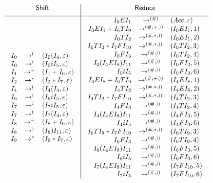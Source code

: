 \documentclass{jarticle}
\begin{document}
 \[
 \begin{array}{c|c}
  \mbox{\sf Shift} & \mbox{\sf Reduce}\\[5pt]\hline
 \begin{array}{rcl}
  I_0 & \rightarrow^{(} & (I_0(I_4,\varepsilon)\\
  I_0 & \rightarrow^{i} & (I_0iI_5,\varepsilon)\\
  I_1 & \rightarrow^{+} & (I_1+I_6,\varepsilon)\\
  I_2 & \rightarrow^{\ast} & (I_2\ast I_7,\varepsilon)\\
  I_4 & \rightarrow^{(} & (I_4(I_4,\varepsilon)\\
  I_6 & \rightarrow^{i} & (I_6iI_5,\varepsilon)\\
  I_7 & \rightarrow^{i} & (I_7iI_5,\varepsilon)\\
  I_7 & \rightarrow^{(} & (I_7(I_4,\varepsilon)\\
  I_8 & \rightarrow^{+} & (I_8+I_6,\varepsilon)\\
  I_8 & \rightarrow^{)} & (I_8)I_{11},\varepsilon)\\
  I_9 & \rightarrow^{\ast} & (I_9\ast I_7,\varepsilon)
 \end{array} &
 \begin{array}{rcl}
  I_0EI_1 & \rightarrow^{(\#)} & (Acc,\varepsilon)\\
  I_0EI_1+I_6TI_9 & \rightarrow^{(\#,+,))}&(I_0EI_1,1)\\
  I_0TI_2 & \rightarrow^{(\#,\ast,))} & (I_0EI_1,2)\\
  I_0TI_2\ast I_7FI_{10} & \rightarrow^{(\#,\ast,))}&(I_0TI_2,3)\\
  I_0FI_3 & \rightarrow^{(\#,))} & (I_0TI_2,4)\\
  I_0(I_4EI_8)I_{11} & \rightarrow^{(\#,))} & (I_0FI_3,5)\\
  I_0iI_5 & \rightarrow^{(\#,))} & (I_0FI_3,6)\\
  I_4EI_8+I_6TI_9 & \rightarrow^{(\#,+,))} & (I_4EI_8,1)\\
  I_4TI_2 & \rightarrow^{(\#,\ast,))} & (I_4EI_8,2)\\
  I_4TI_2\ast I_7FI_{10} & \rightarrow^{(\#,\ast,))}&(I_4TI_2,3)\\
  I_4FI_3 & \rightarrow^{(\#,))} & (I_4TI_2,4)\\
  I_4(I_4EI_8)I_{11} & \rightarrow^{(\#,))} & (I_4FI_3,5)\\
  I_4iI_5 & \rightarrow^{(\#,))} &
   (I_4FI_3,6)\\
  I_6TI_9\ast I_7FI_{10} & \rightarrow^{(\#,\ast,))}&(I_6TI_9,3)\\
  I_6FI_3 & \rightarrow^{(\#,))} & (I_6TI_9,4)\\
  I_6(I_4EI_8)I_{11} & \rightarrow^{(\#,))} & (I_6FI_3,5)\\
  I_6iI_5 & \rightarrow^{(\#,))} &
   (I_6FI_3,6)\\
  I_7(I_4EI_8)I_{11} & \rightarrow^{(\#,))} & (I_7FI_{10},5)\\
  I_7iI_5 & \rightarrow^{(\#,))} &
   (I_7FI_{10},6)\\
 \end{array}
 \end{array}
 \]
\end{document}
